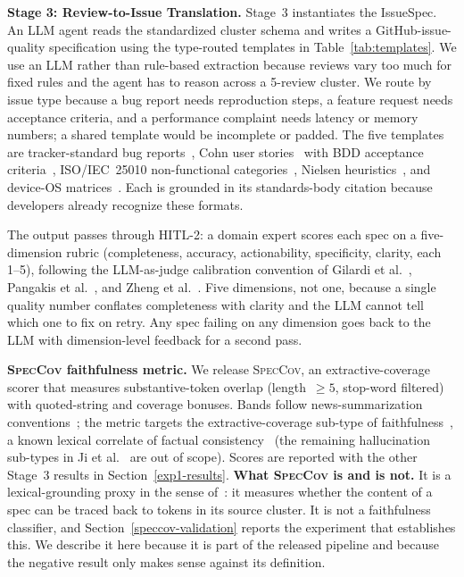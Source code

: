 \documentclass[sigconf, anonymous]{acmart}
\begin{document}
  \textbf{Stage 3: Review-to-Issue Translation.} Stage~3 instantiates
  the IssueSpec. An LLM agent reads the standardized cluster schema and
  writes a GitHub-issue-quality specification using the type-routed
  templates in Table~\ref{tab:templates}. We use an LLM rather than
  rule-based extraction because reviews vary too much for fixed rules
  and the agent has to reason across a 5-review cluster. We route by
  issue type because a bug report needs reproduction steps, a feature
  request needs acceptance criteria, and a performance complaint needs
  latency or memory numbers; a shared template would be incomplete or
  padded. The five templates are tracker-standard bug
  reports~\cite{zimmermann2010makes}, Cohn user stories~\cite{cohn2004user}
  with BDD acceptance criteria~\cite{hellesoy2017cucumber}, ISO/IEC~25010
  non-functional categories~\cite{international2011systems}, Nielsen
  heuristics~\cite{nielsen1994usability}, and device-OS
  matrices~\cite{joorabchi2013real}. Each is grounded in its
  standards-body citation because developers already recognize these
  formats.
  
  The output passes through HITL-2: a domain expert scores each spec on
  a five-dimension rubric (completeness, accuracy, actionability,
  specificity, clarity, each 1--5), following the LLM-as-judge
  calibration convention of Gilardi et al.~\cite{gilardi2023chatgpt},
  Pangakis et al.~\cite{pangakis2023automated}, and Zheng et
  al.~\cite{zheng2023judging}. Five dimensions, not one, because a
  single quality number conflates completeness with clarity and the LLM
  cannot tell which one to fix on retry. Any spec failing on any
  dimension goes back to the LLM with dimension-level feedback for a
  second pass.


\textbf{\textsc{SpecCov} faithfulness metric.} We release \textsc{SpecCov}, an extractive-coverage scorer that measures substantive-token overlap (length~$\geq 5$, stop-word filtered) with quoted-string and coverage bonuses. Bands follow news-summarization conventions~\cite{grusky2018newsroom}; the metric targets the extractive-coverage sub-type of faithfulness~\cite{grusky2018newsroom, maynez2020faithfulness}, a known lexical correlate of factual consistency~\cite{kryscinski2020evaluating} (the remaining hallucination sub-types in Ji et al.~\cite{ji2023survey} are out of scope). Scores are reported with the other Stage~3 results in Section~\ref{exp1-results}.
\textbf{What \textsc{SpecCov} is and is not.} It is a lexical-grounding proxy in the sense
of~\cite{grusky2018newsroom}: it measures whether the content of a spec can be traced back to
tokens in its source cluster. It is not a faithfulness classifier, and Section~\ref{speccov-validation}
reports the experiment that establishes this. We describe it here because it is part of the
released pipeline and because the negative result only makes sense against its definition.
\end{document}
